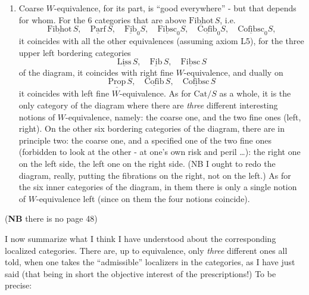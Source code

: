 \documentclass[11pt]{article}
\newcommand{\printedpage}[1]{\marginpar{\footnotesize p.~#1}}
\newcommand{\msp}[1]{\marginpar{\footnotesize [#1]}}
\newcommand{\uc}[1]{\underline{\mathrm{#1}}}
\newcommand{\Cat}{\mathrm{Cat}}
\begin{document}
\begin{enumerate}[leftmargin=*]
\item[3)] Coarse $W$-equivalence, for its part, is ``good everywhere'' - but that depends for whom. For the 6 categories that are above $\uc{Fibhot}\,S$, i.e.
\[
\uc{Fibhot}\,S,\quad \uc{Parf}\,S,\quad \uc{Fib}_0S,\quad \uc{Fibsc}_0S,\quad \uc{Cofib}_0S,\quad \uc{Cofibsc}_0S,
\]
\printedpage{30}
it coincides with all the other equivalences (assuming axiom L5), for the three upper left bordering categories %
\[
\uc{Liss}\,S,\quad \uc{Fib}\,S,\quad \uc{Fibsc}\,S
\]
of the diagram, it coincides with right fine $W$-equivalence, and dually on
\[
\uc{Prop}\,S,\quad \uc{Cofib}\,S,\quad \uc{Cofibsc}\,S
\]
it coincides with left fine $W$-equivalence. As for $\Cat/S$ as a whole, it is the only category of the diagram where there are \textit{three} different interesting notions of $W$-equivalence, namely: the coarse one, and the two fine ones (left, right). On the other six bordering categories of the diagram, there are in principle two: the coarse one, and a specified one of the two fine ones (forbidden to look at the other - at one's own risk and peril \ldots): the right one on the left side, the left one on the right side. (NB I ought to redo the diagram, really, putting the fibrations on the right, not on the left.) As for the six inner categories of the diagram, in them there is only a single notion of $W$-equivalence left (since on them the four notions coincide).
\end{enumerate}

\msp{page 48: blank}

\msp{page 49} (\textbf{NB} there is no page 48)

I now summarize what I think I have understood about the corresponding localized categories. There are, up to equivalence, only \textit{three} different ones all told, when one takes the ``admissible'' localizers in the categories, as I have just said (that being in short the objective interest of the prescriptions!) To be precise:
\end{document}

